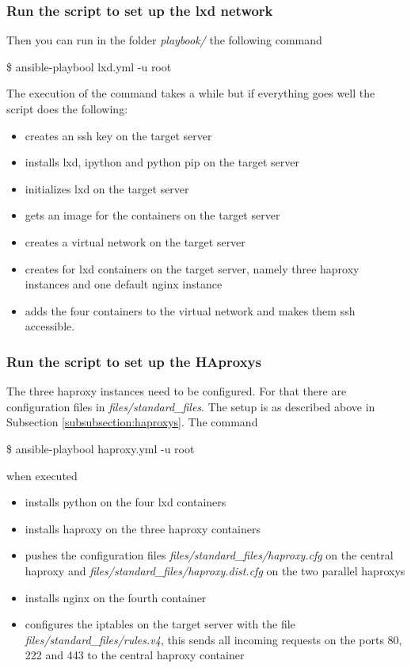 \subsubsection{Run the script to set up the lxd network}
 Then you can run in the folder \textit{playbook/} the following command
\begin{tcolorbox}
\$	ansible-playbool lxd.yml -u root
\end{tcolorbox}

The execution of the command takes a while but if everything goes well the script does the following:
\begin{itemize}
	\item creates an ssh key on the target server
	\item installs lxd, ipython and python pip on the target server
	\item initializes lxd on the target server
	\item gets an image for the containers on the target server
	\item creates a virtual network on the target server
	\item creates for lxd containers on the target server, namely three haproxy instances and one default nginx instance
	\item adds the four containers to the virtual network and makes them ssh accessible.
\end{itemize}

\subsubsection{Run the script to set up the HAproxys}
The three haproxy instances need to be configured. For that there are configuration files in \textit{files/standard\_files}. The setup is as described above in Subsection \ref{subsubsection:haproxys}. The command
\begin{tcolorbox}
\$	ansible-playbool haproxy.yml -u root
\end{tcolorbox}
when executed
\begin{itemize}
	\item installs python on the four lxd containers
	\item installs haproxy on the three haproxy containers
	\item pushes the configuration files \textit{files/standard\_files/haproxy.cfg} on the central haproxy and \textit{files/standard\_files/haproxy.dist.cfg} on the two parallel haproxys
	\item installs nginx on the fourth container
	\item configures the iptables on the target server with the file \textit{files/standard\_files/rules.v4}, this sends all incoming requests on the ports 80, 222 and 443 to the central haproxy container
\end{itemize}